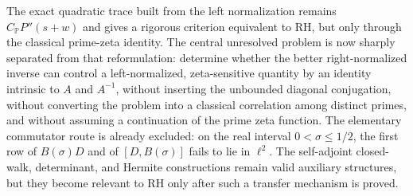 \documentclass[11pt]{amsart}
\numberwithin{equation}{section}
\theoremstyle{plain}
\theoremstyle{definition}
\theoremstyle{remark}
\begin{document}
The exact quadratic trace built from the left normalization remains $C_{\mathbb P}P''(s+w)$ and gives a rigorous criterion equivalent to RH, but only through the classical prime-zeta identity.  The central unresolved problem is now sharply separated from that reformulation: determine whether the better right-normalized inverse can control a left-normalized, zeta-sensitive quantity by an identity intrinsic to $A$ and $A^{-1}$, without inserting the unbounded diagonal conjugation, without converting the problem into a classical correlation among distinct primes, and without assuming a continuation of the prime zeta function.  The elementary commutator route is already excluded: on the real interval $0<\sigma\le1/2$, the first row of $B(\sigma)D$ and of $[D,B(\sigma)]$ fails to lie in $\ell^2$.  The self-adjoint closed-walk, determinant, and Hermite constructions remain valid auxiliary structures, but they become relevant to RH only after such a transfer mechanism is proved.
\end{document}
